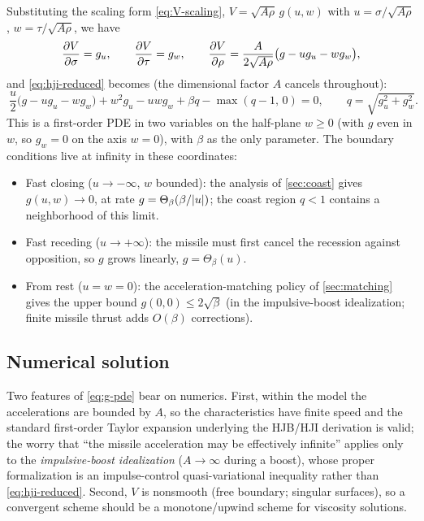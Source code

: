 \documentclass{article}
\theoremstyle{remark}
\begin{document}
Substituting the scaling form \cref{eq:V-scaling},
$V = \sqrt{A\rho}\, g(u, w)$ with $u = \sigma/\sqrt{A\rho}$,
$w = \tau/\sqrt{A\rho}$, we have
\[
  \pdv{V}{\sigma} = g_u, \qquad
  \pdv{V}{\tau} = g_w, \qquad
  \pdv{V}{\rho} = \frac{A}{2\sqrt{A\rho}} \big( g - u g_u - w g_w \big),
\]
and \cref{eq:hji-reduced} becomes (the dimensional factor $A$ cancels
throughout):
\begin{equation}
  \label{eq:g-pde}
  \boxed{\ \frac{u}{2}\big( g - u g_u - w g_w \big)
  + w^2 g_u - u w g_w
  + \beta q - \max( q - 1, \, 0 ) = 0, \qquad q = \sqrt{g_u^2 + g_w^2}. \ }
\end{equation}
This is a first-order PDE in two variables on the half-plane $w \ge 0$ (with
$g$ even in $w$, so $g_w = 0$ on the axis $w = 0$), with $\beta$ as the only
parameter.  The boundary conditions live at infinity in these coordinates:
\begin{itemize}
\item Fast closing ($u \to -\infty$, $w$ bounded): the analysis of
  \cref{sec:coast} gives $g(u, w) \to 0$, at rate $g = \Theta_\beta(\beta /
  \abs{u})$; the coast region $q < 1$ contains a neighborhood of this limit.
\item Fast receding ($u \to +\infty$): the missile must first cancel the
  recession against opposition, so $g$ grows linearly, $g = \Theta_\beta(u)$.
\item From rest ($u = w = 0$): the acceleration-matching policy of
  \cref{sec:matching} gives the upper bound $g(0,0) \le 2\sqrt{\beta}$ (in the
  impulsive-boost idealization; finite missile thrust adds $O(\beta)$
  corrections).
\end{itemize}

\subsection{Numerical solution}
\label{sec:numerics}

Two features of \cref{eq:g-pde} bear on numerics.  First, within the model the
accelerations are bounded by $A$, so the characteristics have finite speed and
the standard first-order Taylor expansion underlying the HJB/HJI derivation is
valid; the worry that ``the missile acceleration may be effectively
infinite'' applies only to the \emph{impulsive-boost idealization} ($A \to
\infty$ during a boost), whose proper formalization is an impulse-control
quasi-variational inequality rather than \cref{eq:hji-reduced}.  Second, $V$
is nonsmooth (free boundary; singular surfaces), so a convergent scheme should
be a monotone/upwind scheme for viscosity solutions.
\end{document}
